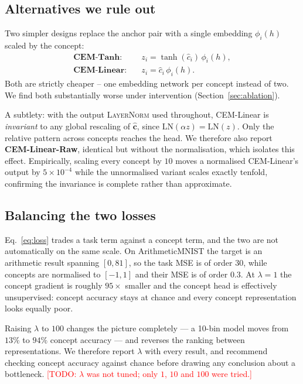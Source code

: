 \documentclass[11pt]{article}
\newcommand{\todo}[1]{\textcolor{red}{[TODO: #1]}}
\newcommand{\cvec}{\mathbf{c}}
\begin{document}
\subsection{Alternatives we rule out}
\label{sec:alternatives}
Two simpler designs replace the anchor pair with a single embedding
$\phi_i(h)$ scaled by the concept:
\begin{align}
  \textbf{CEM-Tanh:}   \quad & z_i = \tanh(\hat{c}_i)\,\phi_i(h), \\
  \textbf{CEM-Linear:} \quad & z_i = \hat{c}_i\,\phi_i(h).
\end{align}
Both are strictly cheaper -- one embedding network per concept instead of two.
We find both substantially worse under intervention
(Section~\ref{sec:ablation}).

A subtlety: with the output \textsc{LayerNorm} used throughout, CEM-Linear is
\emph{invariant} to any global rescaling of $\hat{\cvec}$, since
$\mathrm{LN}(\alpha z) = \mathrm{LN}(z)$. Only the relative pattern across
concepts reaches the head. We therefore also report \textbf{CEM-Linear-Raw},
identical but without the normalisation, which isolates this effect.
Empirically, scaling every concept by $10$ moves a normalised CEM-Linear's
output by $5\times 10^{-4}$ while the unnormalised variant scales exactly
tenfold, confirming the invariance is complete rather than approximate.

\subsection{Balancing the two losses}
\label{sec:lossbalance}
Eq.~\ref{eq:loss} trades a task term against a concept term, and the two are
not automatically on the same scale. On ArithmeticMNIST the target is an
arithmetic result spanning $[0, 81]$, so the task MSE is of order $30$, while
concepts are normalised to $[-1,1]$ and their MSE is of order $0.3$. At
$\lambda = 1$ the concept gradient is roughly $95\times$ smaller and the concept
head is effectively unsupervised: concept accuracy stays at chance and every
concept representation looks equally poor.

Raising $\lambda$ to $100$ changes the picture completely --- a 10-bin model
moves from $13\%$ to $94\%$ concept accuracy --- and reverses the ranking
between representations. We therefore report $\lambda$ with every result, and
recommend checking concept accuracy against chance before drawing any
conclusion about a bottleneck. \todo{$\lambda$ was not tuned; only $1$, $10$
and $100$ were tried.}
\end{document}
